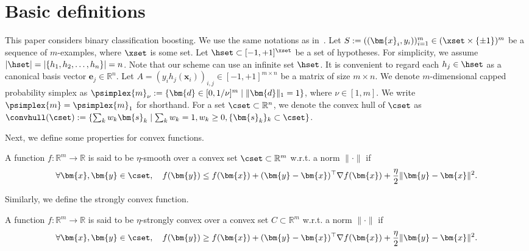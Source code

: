 \section{Basic definitions}
\label{sec:preliminary}
This paper considers binary classification boosting. 
We use the same notations as in~\citep{shalev-shwartz+:jml10}. 
Let $S := ((\bm{x}_i, y_i))_{i=1}^m \in (\xset \times \{\pm 1\})^m$ be 
a sequence of $m$-examples, where $\xset$ is some set. 
Let $\hset \subset [-1, +1]^\xset$ be a set of hypotheses. 
For simplicity, we assume $|\hset| = |\{h_1, h_2, \dots, h_n\}| = n$. 
Note that our scheme can use an infinite set $\hset$. 
It is convenient to regard each $h_j \in \hset$ as 
a canonical basis vector $\bm{e}_j \in \mathbb{R}^n$. 
Let $A = (y_i h_j(\bm x_i))_{i, j} \in [-1, +1]^{m \times n}$ 
be a matrix of size $m \times n$. 
We denote $m$-dimensional capped probability simplex as 
$\psimplex{m}_{\nu} := \{ \bm{d} \in [0, 1/\nu]^m \mid \| \bm{d} \|_1 = 1\}$, 
where $\nu \in [1, m]$. 
We write $\psimplex{m} = \psimplex{m}_{1}$ for shorthand. 
For a set $\cset \subset \mathbb R^n$, 
we denote the convex hull of $\cset$ as 
$
    \convhull (\cset) 
        := \left\{
            \sum_{k} w_k \bm{s}_k
            \mid \sum_k w_k = 1, w_k \geq 0,
            \{\bm{s}_k\}_k \subset \cset
        \right\}
$.

Next, we define some properties for convex functions. 
\begin{def.}
    A function $f : \mathbb R^m \to \mathbb R$ is 
    said to be $\eta$-smooth 
    over a convex set $\cset \subset \mathbb R^m$ 
    w.r.t. a norm $\| \cdot \|$ if 
    \begin{align}
        \label{eq:smoothness}
        \forall \bm{x}, \bm{y} \in \cset, \quad
        f(\bm{y}) 
        \leq f(\bm{x}) + (\bm{y} - \bm{x})^\top \nabla f(\bm{x})
        + \frac{\eta}{2} \|\bm{y} - \bm{x}\|^2.
    \end{align}
\end{def.}

Similarly, we define the strongly convex function. 
\begin{def.}
    A function $f : \mathbb R^m \to \mathbb R$ is 
    said to be $\eta$-strongly convex 
    over a convex set $C \subset \mathbb R^m$ 
    w.r.t. a norm $\| \cdot \|$ if 
    \begin{align}
        \nonumber
        \forall \bm{x}, \bm{y} \in \cset, \quad
        f(\bm{y}) 
        \geq f(\bm{x}) + (\bm{y} - \bm{x})^\top \nabla f(\bm{x})
        + \frac{\eta}{2} \|\bm{y} - \bm{x}\|^2.
    \end{align}
\end{def.}

